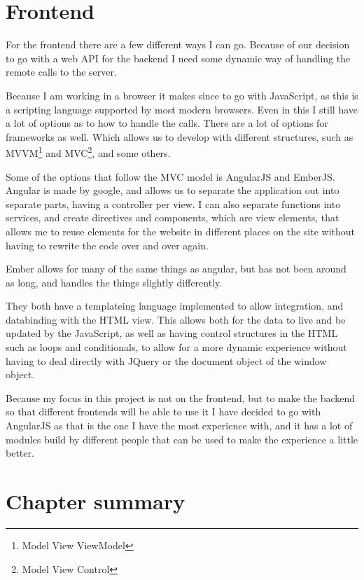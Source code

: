 \section{Frontend}
\label{sec:Frontend}
For the frontend there are a few different ways I can go. Because of our decision to go with a web API for the backend I need some dynamic way of handling the remote calls to the server.

Because I am working in a browser it makes since to go with JavaScript, as this is a scripting language supported by most modern browsers. Even in this I still have a lot of options as to how to handle the calls. There are a lot of options for frameworks as well. Which allows us to develop with different structures, such as MVVM\footnote{Model View ViewModel} and MVC\footnote{Model View Control}, and some others.

Some of the options that follow the MVC model is AngularJS and EmberJS. Angular
is made by google\cite{angularjs}, and allows us to separate the application out
into separate parts, having a controller per view. I can also separate functions
into services, and create directives and components, which are view elements, that allows me to reuse elements for the website in different places on the site without having to rewrite the code over and over again.

Ember allows for many of the same things as angular, but has not been around as long, and handles the things slightly differently\cite{emberjs}.

They both have a templateing language implemented to allow integration, and databinding with the HTML view. This allows both for the data to live and be updated by the JavaScript, as well as having control structures in the HTML such as loops and conditionals, to allow for a more dynamic experience without having to deal directly with JQuery or the document object of the window object.

Because my focus in this project is not on the frontend, but to make the backend so that different frontends will be able to use it I have decided to go with AngularJS as that is the one I have the most experience with, and it has a lot of modules build by different people that can be used to make the experience a little better.

\section{Chapter summary }
